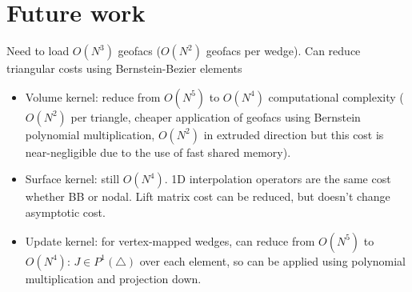 \documentclass{siamart0216}
\begin{document}
\section{Future work}

Need to load $O(N^3)$ geofacs ($O(N^2)$ geofacs per wedge).  Can reduce triangular costs using Bernstein-Bezier elements
\begin{itemize}
\item Volume kernel: reduce from $O(N^5)$ to $O(N^4)$ computational complexity ($O(N^2)$ per triangle, cheaper application of geofacs using Bernstein polynomial multiplication, $O(N^2)$ in extruded direction but this cost is near-negligible due to the use of fast shared memory).  
\item Surface kernel: still $O(N^4)$.  1D interpolation operators are the same cost whether BB or nodal.  Lift matrix cost can be reduced, but doesn't change asymptotic cost.  
\item Update kernel: for vertex-mapped wedges, can reduce from $O(N^5)$ to $O(N^4)$: $J \in P^1(\triangle)$ over each element, so can be applied using polynomial multiplication and projection down.  
\end{itemize}




\end{document}
